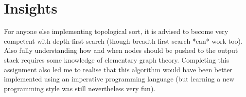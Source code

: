 \documentclass[12pt]{article}
\begin{document}
\section{Insights}
For anyone else implementing topological sort, it is advised to become very competent with depth-first search (though breadth first search *can* work too). Also fully understanding how and when nodes should be pushed to the output stack requires some knowledge of elementary graph theory. Completing this assignment also led me to realise that this algorithm would have been better implemented using an imperative programming language (but learning a new programming style was still nevertheless very fun). 
\end{document}
